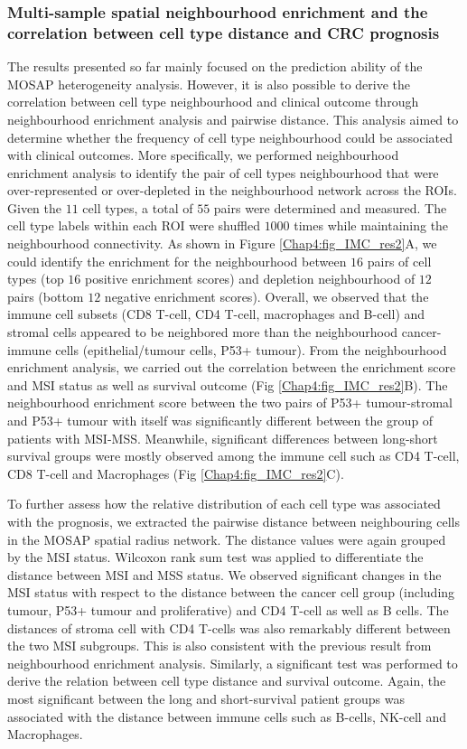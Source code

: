 \subsubsection{Multi-sample spatial neighbourhood enrichment and the correlation between cell type distance and CRC prognosis}
The results presented so far mainly focused on the prediction ability of the MOSAP heterogeneity analysis. However, it is also possible to derive the correlation between cell type neighbourhood and clinical outcome through neighbourhood enrichment analysis and pairwise distance. This analysis aimed to determine whether the frequency of cell type neighbourhood could be associated with clinical outcomes. More specifically, we performed neighbourhood enrichment analysis to identify the pair of cell types neighbourhood that were over-represented or over-depleted in the neighbourhood network across the ROIs. Given the $11$ cell types, a total of $55$ pairs were determined and measured. The cell type labels within each ROI were shuffled $1000$ times while maintaining the neighbourhood connectivity. As shown in Figure \ref{Chap4:fig_IMC_res2}A, we could identify the enrichment for the neighbourhood between $16$ pairs of cell types (top $16$ positive enrichment scores) and depletion neighbourhood of $12$ pairs (bottom $12$ negative enrichment scores). Overall, we observed that the immune cell subsets (\ie CD8 T-cell, CD4 T-cell, macrophages and B-cell) and stromal cells appeared to be neighbored more than the neighbourhood cancer-immune cells (\ie epithelial/tumour cells, P53+ tumour). From the neighbourhood enrichment analysis, we carried out the correlation between the enrichment score and MSI status as well as survival outcome (Fig \ref{Chap4:fig_IMC_res2}B). The neighbourhood enrichment score between the two pairs of P53+ tumour-stromal and P53+ tumour with itself  was significantly different between the group of patients with MSI-MSS. Meanwhile, significant differences between long-short survival groups were mostly observed among the immune cell such as CD4 T-cell, CD8 T-cell and Macrophages (Fig \ref{Chap4:fig_IMC_res2}C). 

To further assess how the relative distribution of each cell type was associated with the prognosis, we extracted the pairwise distance between neighbouring cells in the MOSAP spatial radius network. The distance values were again grouped by the MSI status. Wilcoxon rank sum test was applied to differentiate the distance between MSI and MSS status. We observed significant changes in the MSI status with respect to the distance between the cancer cell group (including tumour, P53+ tumour and proliferative) and CD4 T-cell as well as B cells. The distances of stroma cell with CD4 T-cells was also remarkably different between the two MSI subgroups. This is also consistent with the previous result from neighbourhood enrichment analysis. Similarly, a significant test was performed to derive the relation between cell type distance and survival outcome. Again, the most significant between the long and short-survival patient groups was associated with the distance between immune cells such as B-cells, NK-cell and Macrophages.  

